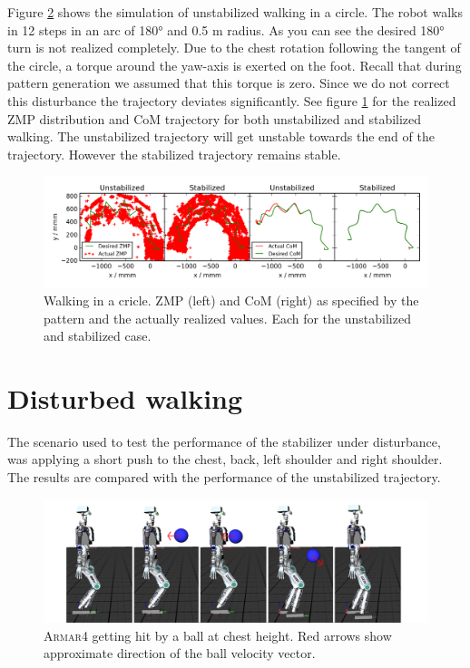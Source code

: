 \documentclass[english,ngerman]{KITreprt}
\newcommand{\name}[1]{\textsc{#1}}
\begin{document}
Figure \ref{img:player-undisturbed-circle-thumbs} shows the simulation
of unstabilized walking in a circle. The robot walks in 12 steps in an
arc of 180° and 0.5 m radius. As you can see the desired 180° turn is
not realized completely. Due to the chest rotation following the tangent
of the circle, a torque around the yaw-axis is exerted on the foot.
Recall that during pattern generation we assumed that this torque is
zero. Since we do not correct this disturbance the trajectory deviates
significantly. See figure \ref{img:undisturbed-circle} for the realized
ZMP distribution and CoM trajectory for both unstabilized and stabilized
walking. The unstabilized trajectory will get unstable towards the end
of the trajectory. However the stabilized trajectory remains stable.

\begin{figure}[hbt]
\vspace*{-1em}
\includegraphics[width=\textwidth,resolution=300]{images/undisturbed_circle.png}
\caption{Walking in a cricle. ZMP (left) and CoM (right) as specified by the pattern and the actually realized values.
Each for the unstabilized and stabilized case.}
\label{img:undisturbed-circle}
\end{figure}

\section{Disturbed walking}\label{disturbed-walking}

The scenario used to test the performance of the stabilizer under
disturbance, was applying a short push to the chest, back, left shoulder
and right shoulder. The results are compared with the performance of the
unstabilized trajectory.

\begin{figure}[H]
\vspace*{-1em}
\includegraphics[width=\textwidth,resolution=300]{images/disturbed_straight_thumbs.png}
\caption{\name{Armar4} getting hit by a ball at chest height. Red arrows show approximate direction of the ball velocity vector.}
\label{img:player-undisturbed-circle-thumbs}
\end{figure}
\end{document}
